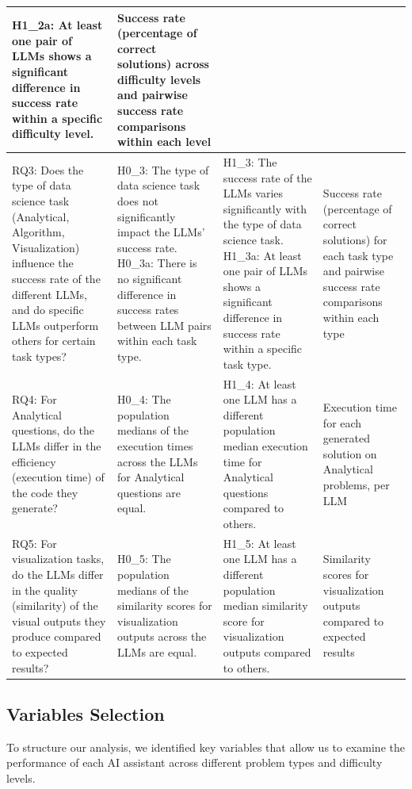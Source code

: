 \documentclass[conference]{IEEEtran}
\begin{document}
\begin{table}[!ht]
\begin{tabular}{|p{5.2cm}|p{3.7cm}|p{3.7cm}|p{3.7cm}|}
H1\_2a: At least one pair of LLMs shows a significant difference in success rate within a specific difficulty level. & 
Success rate (percentage of correct solutions) across difficulty levels and pairwise success rate comparisons within each level \\
\hline
RQ3: Does the type of data science task (Analytical, Algorithm, Visualization) influence the success rate of the different LLMs, and do specific LLMs outperform others for certain task types? & 
H0\_3: The type of data science task does not significantly impact the LLMs' success rate. \newline
H0\_3a: There is no significant difference in success rates between LLM pairs within each task type. & 
H1\_3: The success rate of the LLMs varies significantly with the type of data science task. \newline
H1\_3a: At least one pair of LLMs shows a significant difference in success rate within a specific task type. & 
Success rate (percentage of correct solutions) for each task type and pairwise success rate comparisons within each type \\
\hline
RQ4: For Analytical questions, do the LLMs differ in the efficiency (execution time) of the code they generate? & 
H0\_4: The population medians of the execution times across the LLMs for Analytical questions are equal. & 
H1\_4: At least one LLM has a different population median execution time for Analytical questions compared to others. & 
Execution time for each generated solution on Analytical problems, per LLM \\
\hline
RQ5: For visualization tasks, do the LLMs differ in the quality (similarity) of the visual outputs they produce compared to expected results? & 
H0\_5: The population medians of the similarity scores for visualization outputs across the LLMs are equal. & 
H1\_5: At least one LLM has a different population median similarity score for visualization outputs compared to others. & 
Similarity scores for visualization outputs compared to expected results \\
\hline
\end{tabular}
\label{tab:research_questions_hypotheses_metrics}
\end{table}


\subsection{Variables Selection}

To structure our analysis, we identified key variables that allow us to examine the performance of each AI assistant across different problem types and difficulty levels. 
\end{document}
